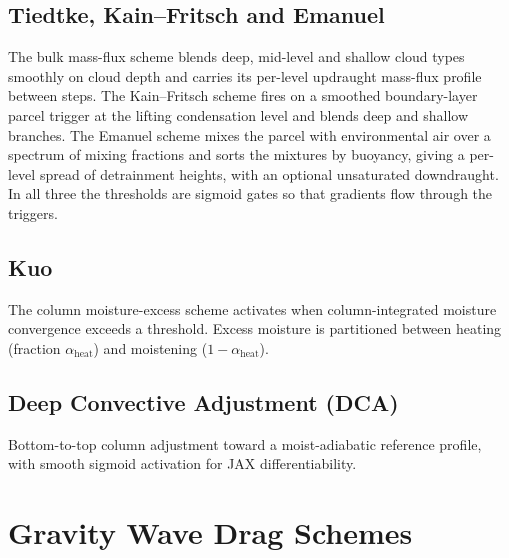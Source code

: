 \documentclass[11pt,twoside]{report}
\begin{document}
\subsection{Tiedtke, Kain--Fritsch and Emanuel}
The \citet{Tiedtke1989} bulk mass-flux scheme blends deep, mid-level and
shallow cloud types smoothly on cloud depth and carries its per-level updraught
mass-flux profile between steps.  The Kain--Fritsch scheme fires on a smoothed
boundary-layer parcel trigger at the lifting condensation level and blends
deep and shallow branches.  The Emanuel scheme mixes the parcel with
environmental air over a spectrum of mixing fractions and sorts the mixtures
by buoyancy, giving a per-level spread of detrainment heights, with an
optional unsaturated downdraught.  In all three the thresholds are sigmoid
gates so that gradients flow through the triggers.

\subsection{Kuo}
The \citet{Kuo1974} column moisture-excess scheme activates when column-integrated moisture
convergence exceeds a threshold.  Excess moisture is partitioned between
heating (fraction $\alpha_{\mathrm{heat}}$) and moistening
($1-\alpha_{\mathrm{heat}}$).

\subsection{Deep Convective Adjustment (DCA)}
Bottom-to-top column adjustment toward a moist-adiabatic reference profile,
with smooth sigmoid activation for JAX differentiability.

\section{Gravity Wave Drag Schemes}
\label{sec:gwd-schemes}
\end{document}
